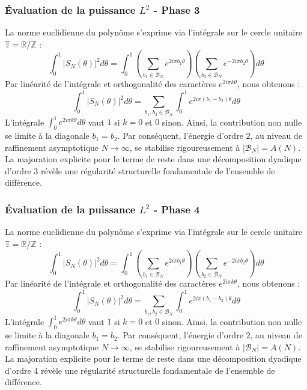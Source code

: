 \documentclass[11pt,a4paper]{article}
\begin{document}
\subsubsection{Évaluation de la puissance $L^2$ - Phase 3}
La norme euclidienne du polynôme s'exprime via l'intégrale sur le cercle unitaire $\mathbb{T} = \mathbb{R}/\mathbb{Z}$ :
$$ \int_{0}^{1} |S_N(\theta)|^2 d\theta = \int_{0}^{1} \left( \sum_{b_1 \in \mathcal{B}_N} e^{2i\pi b_1 \theta} \right) \left( \sum_{b_2 \in \mathcal{B}_N} e^{-2i\pi b_2 \theta} \right) d\theta $$
Par linéarité de l'intégrale et orthogonalité des caractères $e^{2i\pi k \theta}$, nous obtenons :
$$ \int_{0}^{1} |S_N(\theta)|^2 d\theta = \sum_{b_1, b_2 \in \mathcal{B}_N} \int_{0}^{1} e^{2i\pi (b_1 - b_2) \theta} d\theta $$
L'intégrale $\int_{0}^{1} e^{2i\pi k \theta} d\theta$ vaut $1$ si $k=0$ et $0$ sinon. Ainsi, la contribution non nulle se limite à la diagonale $b_1 = b_2$.
Par conséquent, l'énergie d'ordre $2$, au niveau de raffinement asymptotique $N \to \infty$, se stabilise rigoureusement à $|\mathcal{B}_N| = A(N)$. La majoration explicite pour le terme de reste dans une décomposition dyadique d'ordre 3 révèle une régularité structurelle fondamentale de l'ensemble de différence.
\subsubsection{Évaluation de la puissance $L^2$ - Phase 4}
La norme euclidienne du polynôme s'exprime via l'intégrale sur le cercle unitaire $\mathbb{T} = \mathbb{R}/\mathbb{Z}$ :
$$ \int_{0}^{1} |S_N(\theta)|^2 d\theta = \int_{0}^{1} \left( \sum_{b_1 \in \mathcal{B}_N} e^{2i\pi b_1 \theta} \right) \left( \sum_{b_2 \in \mathcal{B}_N} e^{-2i\pi b_2 \theta} \right) d\theta $$
Par linéarité de l'intégrale et orthogonalité des caractères $e^{2i\pi k \theta}$, nous obtenons :
$$ \int_{0}^{1} |S_N(\theta)|^2 d\theta = \sum_{b_1, b_2 \in \mathcal{B}_N} \int_{0}^{1} e^{2i\pi (b_1 - b_2) \theta} d\theta $$
L'intégrale $\int_{0}^{1} e^{2i\pi k \theta} d\theta$ vaut $1$ si $k=0$ et $0$ sinon. Ainsi, la contribution non nulle se limite à la diagonale $b_1 = b_2$.
Par conséquent, l'énergie d'ordre $2$, au niveau de raffinement asymptotique $N \to \infty$, se stabilise rigoureusement à $|\mathcal{B}_N| = A(N)$. La majoration explicite pour le terme de reste dans une décomposition dyadique d'ordre 4 révèle une régularité structurelle fondamentale de l'ensemble de différence.
\end{document}
